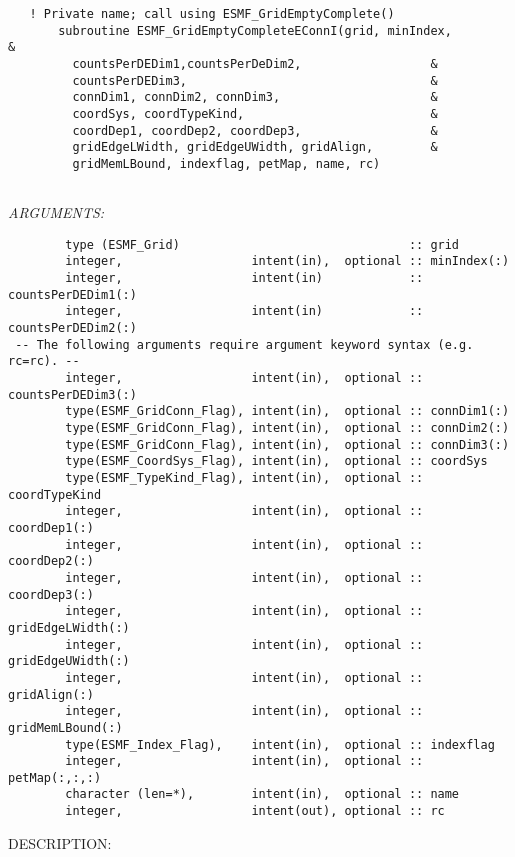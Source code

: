  
\begin{verbatim}   ! Private name; call using ESMF_GridEmptyComplete()
       subroutine ESMF_GridEmptyCompleteEConnI(grid, minIndex,         &
         countsPerDEDim1,countsPerDeDim2,                  &
         countsPerDEDim3,                                  &
         connDim1, connDim2, connDim3,                     &
         coordSys, coordTypeKind,                          &
         coordDep1, coordDep2, coordDep3,                  &
         gridEdgeLWidth, gridEdgeUWidth, gridAlign,        &
         gridMemLBound, indexflag, petMap, name, rc)
 
 \end{verbatim}{\em ARGUMENTS:}
\begin{verbatim}        type (ESMF_Grid)                                :: grid
        integer,                  intent(in),  optional :: minIndex(:)
        integer,                  intent(in)            :: countsPerDEDim1(:)
        integer,                  intent(in)            :: countsPerDEDim2(:)
 -- The following arguments require argument keyword syntax (e.g. rc=rc). --
        integer,                  intent(in),  optional :: countsPerDEDim3(:)
        type(ESMF_GridConn_Flag), intent(in),  optional :: connDim1(:)
        type(ESMF_GridConn_Flag), intent(in),  optional :: connDim2(:)
        type(ESMF_GridConn_Flag), intent(in),  optional :: connDim3(:)
        type(ESMF_CoordSys_Flag), intent(in),  optional :: coordSys
        type(ESMF_TypeKind_Flag), intent(in),  optional :: coordTypeKind
        integer,                  intent(in),  optional :: coordDep1(:)
        integer,                  intent(in),  optional :: coordDep2(:)
        integer,                  intent(in),  optional :: coordDep3(:)
        integer,                  intent(in),  optional :: gridEdgeLWidth(:)
        integer,                  intent(in),  optional :: gridEdgeUWidth(:)
        integer,                  intent(in),  optional :: gridAlign(:)
        integer,                  intent(in),  optional :: gridMemLBound(:)
        type(ESMF_Index_Flag),    intent(in),  optional :: indexflag
        integer,                  intent(in),  optional :: petMap(:,:,:)
        character (len=*),        intent(in),  optional :: name
        integer,                  intent(out), optional :: rc\end{verbatim}
{\sf DESCRIPTION:\\ }



